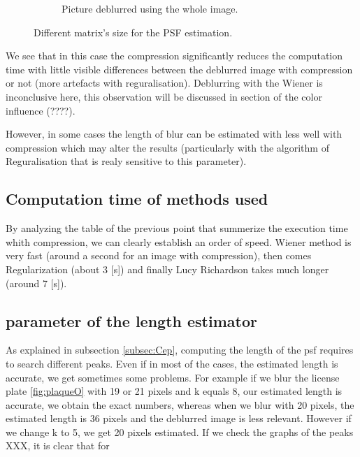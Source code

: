 \begin{figure}[h]
\begin{subfigure}{0.32\textwidth}
\vspace{-30pt}
\caption{Picture deblurred using the whole image.}
\label{fig:Regcom}
\end{subfigure}
\caption{Different matrix's size for the PSF estimation.}
\end{figure}

We see that in this case the compression significantly reduces the computation time with little visible differences between the deblurred image with compression or not (more artefacts with reguralisation). Deblurring with the Wiener is inconclusive here, this observation will be discussed in section of the color influence (????).

However, in some cases the length of blur can be estimated with less well with compression which may alter the results (particularly with the algorithm of Reguralisation that is realy sensitive to this parameter).

\subsection{Computation time of methods used}

By analyzing the table of the previous point that summerize the execution time whith compression, we can clearly establish an order of speed. Wiener method is very fast (around a second for an image with compression), then comes Regularization (about 3 [s]) and finally Lucy Richardson takes much longer (around 7 [s]).



\subsection{parameter of the length estimator}

As explained in subsection \ref{subsec:Cep}, computing the length of the psf requires to search different peaks. Even if in most of the cases, the estimated length is accurate, we get sometimes some problems. For example if we blur the license plate \ref{fig:plaqueO} with 19 or 21 pixels and k equals 8, our estimated length is accurate, we obtain the exact numbers, whereas when we blur with 20 pixels, the estimated length is 36 pixels and the deblurred image is less relevant. However if we change k to 5, we get 20 pixels estimated. If we check the graphs of the peaks XXX, it is clear that for 


